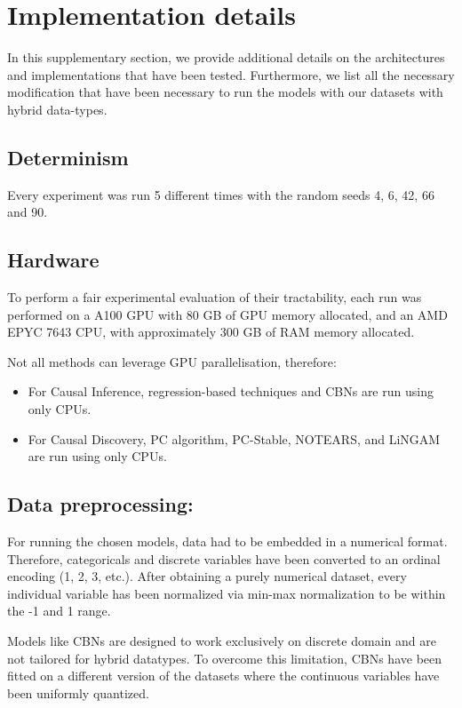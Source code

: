 \section{Implementation details}\label{sec:appendix_implementation}

In this supplementary section, we provide additional details on the architectures and implementations that have been tested. Furthermore, we list all the necessary modification that have been necessary to run the models with our datasets with hybrid data-types.

\subsection{Determinism}

Every experiment was run 5 different times with the random seeds 4, 6, 42, 66 and 90. 

\subsection{Hardware}
To perform a fair experimental evaluation of their tractability, each run was performed on a A100 GPU with 80 GB of GPU memory allocated, and an AMD EPYC 7643 CPU, with approximately 300 GB of RAM memory allocated.

Not all methods can leverage GPU parallelisation, therefore:

\begin{itemize}
    \item For Causal Inference, regression-based techniques and CBNs are run using only CPUs. 
    \item For Causal Discovery, PC algorithm, PC-Stable, NOTEARS, and LiNGAM are run using only CPUs.
\end{itemize}

\subsection{Data preprocessing:} For running the chosen models, data had to be embedded in a numerical format. Therefore, categoricals and discrete variables have been converted to an ordinal encoding (1, 2, 3, etc.). After obtaining a purely numerical dataset, every individual variable has been normalized via min-max normalization to be within the -1 and 1 range. 

Models like CBNs are designed to work exclusively on discrete domain and are not tailored for hybrid datatypes.
To overcome this limitation, CBNs have been fitted on a different version of the datasets where the continuous variables have been uniformly quantized.


